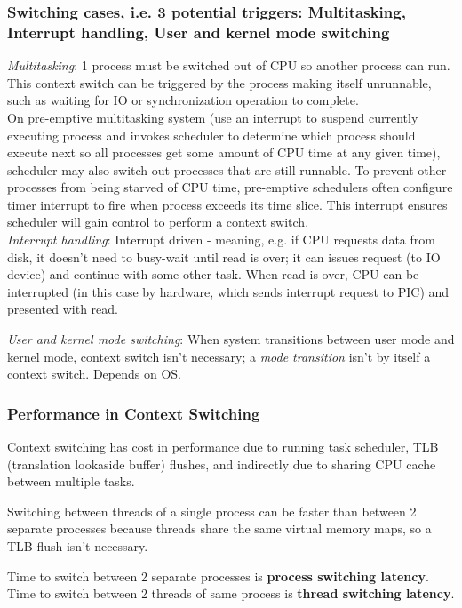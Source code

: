 \documentclass[10pt]{amsart}
\begin{document}
\begin{multicols*}{2}
\subsubsection{Switching cases, i.e. 3 potential triggers: Multitasking, Interrupt handling, User and kernel mode switching}

\emph{Multitasking}: 1 process must be switched out of CPU so another process can run. This context switch can be triggered by the process making itself unrunnable, such as waiting for IO or synchronization operation to complete. \\
On pre-emptive multitasking system (use an interrupt to suspend currently executing process and invokes scheduler to determine which process should execute next so all processes get some amount of CPU time at any given time), scheduler may also switch out processes that are still runnable. To prevent other processes from being starved of CPU time, pre-emptive schedulers often configure timer interrupt to fire when process exceeds its time slice. This interrupt ensures scheduler will gain control to perform a context switch. \\

\emph{Interrupt handling}: Interrupt driven - meaning, e.g. if CPU requests data from disk, it doesn't need to busy-wait until read is over; it can issues request (to IO device) and continue with some other task. When read is over, CPU can be interrupted (in this case by hardware, which sends interrupt request to PIC) and presented with read.

\emph{User and kernel mode switching}: When system transitions between user mode and kernel mode, context switch isn't necessary; a \emph{mode transition} isn't by itself a context switch. Depends on OS.

\subsubsection{Performance in Context Switching}

Context switching has cost in performance due to running task scheduler, TLB (translation lookaside buffer) flushes, and indirectly due to sharing CPU cache between multiple tasks.

Switching between threads of a single process can be faster than between 2 separate processes because threads share the same virtual memory maps, so a TLB flush isn't necessary.

Time to switch between 2 separate processes is \textbf{process switching latency}. Time to switch between 2 threads of same process is \textbf{thread switching latency}. 


\end{multicols*}
\end{document}
